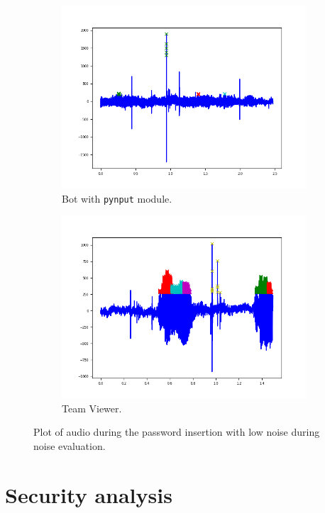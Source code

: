 \begin{figure}[h]
     \centering
	 \begin{subfigure}[b]{0.48\textwidth}
         \centering
         \includegraphics[width=\linewidth]{Images/Results/Bot/noise}
         \caption{\footnotesize{Bot with \texttt{pynput} module.}}
     \end{subfigure}
	 \hfill     
     \begin{subfigure}[b]{0.48\textwidth}
         \centering
         \includegraphics[width=\linewidth]{Images/Results/TeamViewer/noise}
         \caption{\footnotesize{Team Viewer.}}
     \end{subfigure}
     \caption{\footnotesize{Plot of audio during the password insertion with low noise during noise evaluation.}}\label{Results:noise_img}
\end{figure}

\section{Security analysis}
